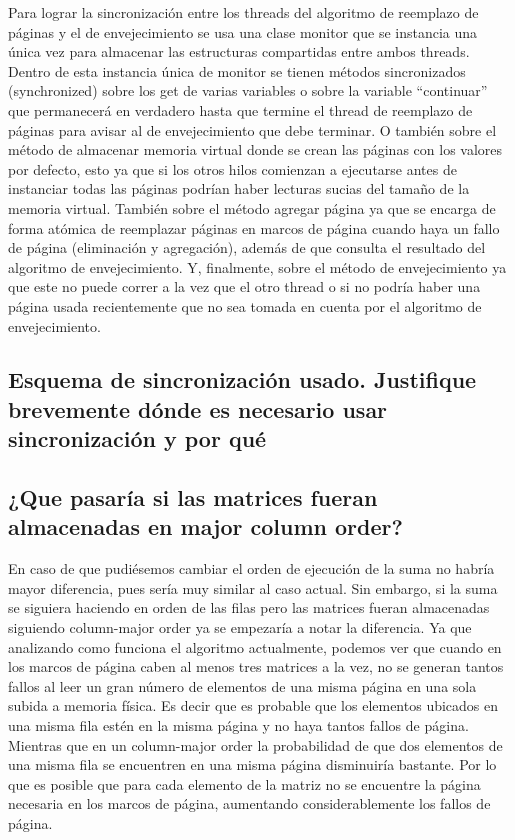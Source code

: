 \documentclass[a4paper]{article}
\begin{document}
Para lograr la sincronización entre los threads del algoritmo de reemplazo de páginas y el de envejecimiento se usa una clase monitor que se instancia una única vez para almacenar las estructuras compartidas entre ambos threads. Dentro de esta instancia única de monitor se tienen métodos sincronizados (synchronized) sobre los get de varias variables o sobre la variable “continuar” que permanecerá en verdadero hasta que termine el thread de reemplazo de páginas para avisar al de envejecimiento que debe terminar. O también sobre el método de almacenar memoria virtual donde se crean las páginas con los valores por defecto, esto ya que si los otros hilos comienzan a ejecutarse antes de instanciar todas las páginas podrían haber lecturas sucias del tamaño de la memoria virtual. También sobre el método agregar página ya que se encarga de forma atómica de reemplazar páginas en marcos de página cuando haya un fallo de página (eliminación y agregación), además de que consulta el resultado del algoritmo de envejecimiento. Y, finalmente, sobre el método de envejecimiento ya que este no puede correr a la vez que el otro thread o si no podría haber una página usada recientemente que no sea tomada en cuenta por el algoritmo de envejecimiento.

\subsection{Esquema de sincronización usado. Justifique brevemente dónde es necesario usar sincronización y por qué}



\subsection{¿Que pasaría si las matrices fueran almacenadas en major column order?}
En caso de que pudiésemos cambiar el orden de ejecución de la suma no habría mayor diferencia, pues sería muy similar al caso actual. Sin embargo, si la suma se siguiera haciendo en orden de las filas pero las matrices fueran almacenadas siguiendo column-major order ya se empezaría a notar la diferencia. Ya que analizando como funciona el algoritmo actualmente, podemos ver que cuando en los marcos de página caben al menos tres matrices a la vez, no se generan tantos fallos al leer un gran número de elementos de una misma página en una sola subida a memoria física. Es decir que es probable que los elementos ubicados en una misma fila estén en la misma página y no haya tantos fallos de página. Mientras que en un column-major order la probabilidad de que dos elementos de una misma fila se encuentren en una misma página disminuiría bastante. Por lo que es posible que para cada elemento de la matriz no se encuentre la página necesaria en los marcos de página, aumentando considerablemente los fallos de página.
\end{document}
